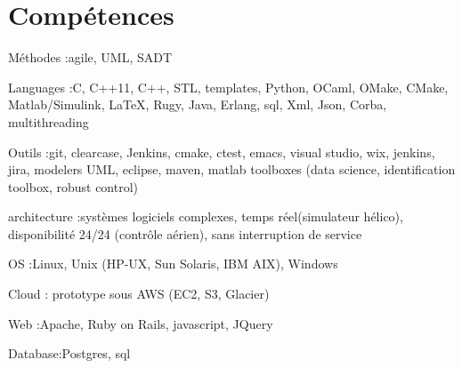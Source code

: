 \section{Compétences}

\begin{itemize}

\myitem
{Méthodes :}{agile, UML, SADT}

\myitem
{Languages :}{C, C++11, C++, STL, templates, Python, OCaml, OMake, CMake, Matlab/Simulink, LaTeX, Rugy, Java, Erlang, sql, Xml, Json, Corba, multithreading}

\myitem
{Outils :}{git, clearcase, Jenkins, cmake, ctest, emacs, visual studio, wix, jenkins, jira, modelers UML, eclipse, maven, matlab toolboxes (data science, identification toolbox, robust control)}

\myitem
{architecture :}{systèmes logiciels complexes, temps réel(simulateur hélico), disponibilité 24/24 (contrôle aérien), sans interruption de service}

\myitem
{OS :}{Linux, Unix (HP-UX, Sun Solaris, IBM AIX), Windows}

\myitem
{Cloud} : {prototype sous AWS (EC2, S3, Glacier)}

\myitem 
{Web :}{Apache, Ruby on Rails, javascript, JQuery}

\myitem 
{Database:}{Postgres, sql}

\end{itemize}
